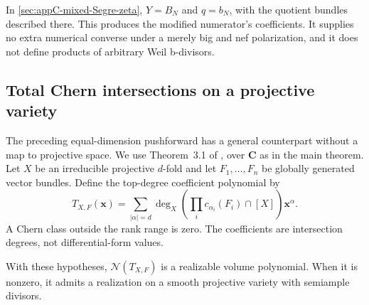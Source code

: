 In \cref{sec:appC-mixed-Segre-zeta}, $Y=B_N$ and $q=b_N$,
with the quotient bundles described there. This produces the
modified numerator's coefficients. It supplies no extra
numerical converse under a merely big and nef polarization,
and it does not define products of arbitrary Weil b-divisors.

\subsection{Total Chern intersections on a projective variety}
\label{sec:appF-total-Chern-volume}

The preceding equal-dimension pushforward has a general counterpart
without a map to projective space. We use Theorem~3.1 of
\cite{NguyenDang26RichardsonV2}, over $\mathbf C$ as in the
main theorem. Let $X$ be an irreducible projective $d$-fold and
let $F_1,\ldots,F_n$ be globally generated vector bundles. Define
the top-degree coefficient polynomial by
\[
 T_{X,F}(\mathbf x)
    =\sum_{|\alpha|=d}
       \deg_X\left(\prod_i c_{\alpha_i}(F_i)\cap[X]\right)
                                                     \mathbf x^\alpha.
\tag{F.24}\label{eq:appF-total-Chern-polynomial}
\]
A Chern class outside the rank range is zero. The coefficients
are intersection degrees, not differential-form values.

\begin{theorem}
\label{thm:appF-total-Chern-volume}
With these hypotheses, $\mathcal N(T_{X,F})$ is a realizable
volume polynomial. When it is nonzero, it admits a realization
on a smooth projective variety with semiample divisors.
\end{theorem}

